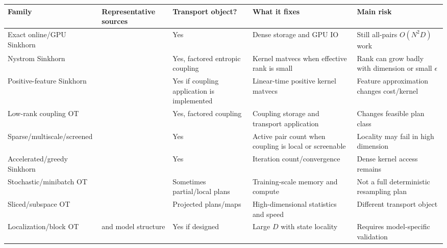 \documentclass[11pt]{article}
\begin{document}
\small
\begin{longtable}{p{}p{}p{}p{}p{}}
\toprule
Family & Representative sources & Transport object? & What it fixes & Main risk \\
\midrule
\endhead
Exact online/GPU Sinkhorn &
\citep{feydy2019geomloss,charlier2021keops,ye2026flashsinkhorn,xiao2026fastsinkhorn}
& Yes & Dense storage and GPU IO & Still all-pairs $O(N^2D)$ work \\
Nystrom Sinkhorn & \citep{altschuler2019nystrom} & Yes, factored entropic
coupling & Kernel matvecs when effective rank is small & Rank can grow badly
with dimension or small $\epsilon$ \\
Positive-feature Sinkhorn & \citep{scetbon2020positivefeatures} & Yes if
coupling application is implemented & Linear-time positive kernel matvecs &
Feature approximation changes cost/kernel \\
Low-rank coupling OT &
\citep{forrow2019factored,scetbon2021lowrank,scetbon2022lowrank,scetbon2023unbalanced,halmos2024frlc,halmos2025hierarchical,jawanpuria2026riemannian}
& Yes,
factored coupling & Coupling storage and transport application & Changes
feasible plan class \\
Sparse/multiscale/screened &
\citep{schmitzer2016sparse,schmitzer2019stabilized,alaya2019screenkhorn}
& Yes & Active pair count when coupling is local or screenable & Locality may
fail in high dimension \\
Accelerated/greedy Sinkhorn &
\citep{altschuler2017nearlinear,dvurechensky2018computational,abid2018greedy,lin2019efficient,xu2026accelerating}
& Yes &
Iteration count/convergence & Dense kernel access remains \\
Stochastic/minibatch OT &
\citep{genevay2016stochastic,genevay2018samplecomplexity,nguyen2022bomb,nguyen2021partialminibatch}
& Sometimes
partial/local plans & Training-scale memory and compute & Not a full
deterministic resampling plan \\
Sliced/subspace OT &
\citep{paty2019subspace,kolouri2019generalized,deshpande2019maxsliced,nguyen2025sliced}
&
Projected plans/maps & High-dimensional statistics and speed & Different
transport object \\
Localization/block OT & \citep{reich2013nonparametric} and model structure & Yes
if designed & Large $D$ with state locality & Requires model-specific
validation \\
\bottomrule
\end{longtable}
\normalsize
\end{document}

